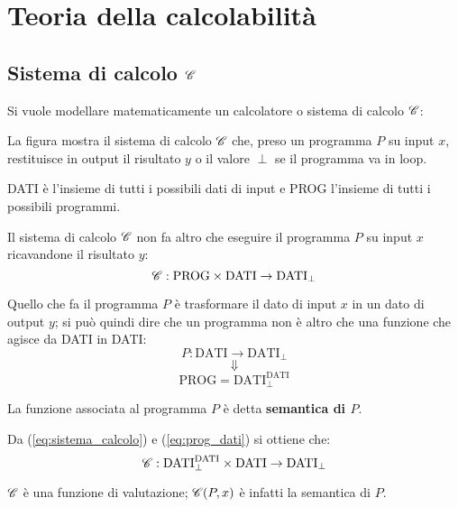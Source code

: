 \section{Teoria della calcolabilità}

\subsection{Sistema di calcolo \texorpdfstring{$\mathcal{C}$}{C}}
Si vuole modellare matematicamente un calcolatore o sistema di calcolo $\mathcal{C}$:
\vspace{.4cm}
\begin{figure}[h]
    \centering
    
\end{figure}

La figura mostra il sistema di calcolo $\mathcal{C}$ che, preso un programma $P$
su input $x$, restituisce in output il risultato $y$ o il valore $\perp$
se il programma va in loop.

DATI è l'insieme di tutti i possibili dati di input e PROG l'insieme di
tutti i possibili programmi.

Il sistema di calcolo $\mathcal{C}$ non fa altro che eseguire il programma $P$ su input
$x$ ricavandone il risultato $y$:
\begin{equation}\label{eq:sistema_calcolo}
\mathcal{C}:\text{PROG}\times\text{DATI}\rightarrow\text{DATI}_\perp
\end{equation}

Quello che fa il programma $P$ è trasformare il dato di input $x$ in un dato
di output $y$; si può quindi dire che un programma non è altro che
una funzione che agisce da DATI in DATI:
$$ P:\text{DATI} \rightarrow \text{DATI}_\perp $$
$$ \Downarrow $$
\begin{equation}\label{eq:prog_dati} \text{PROG} =
\text{DATI}^{\text{DATI}}_\perp \end{equation}

La funzione associata al programma $P$ è detta \textbf{semantica di $P$}.

Da (\ref{eq:sistema_calcolo}) e (\ref{eq:prog_dati}) si ottiene che:
$$ \mathcal{C}:\text{DATI}^{\text{DATI}}_\perp\times\text{DATI}
\rightarrow\text{DATI}_\perp $$

$\mathcal{C}$ è una funzione di valutazione; $\mathcal{C}(P,x)$ è infatti la semantica di $P$.

